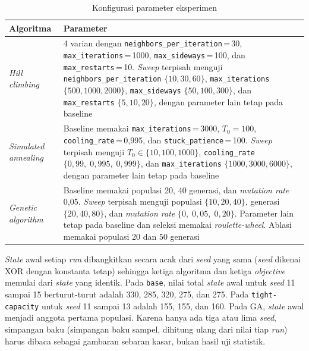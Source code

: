\begin{table}[H]
    \centering
    \begin{tabular}{@{}p{3.4cm}p{11.6cm}@{}}
        \toprule
        Algoritma                    & Parameter                                                                                                                                                                                                                                                                                                                       \\
        \midrule
        \textit{Hill climbing}       & 4 varian dengan \texttt{neighbors\_per\_iteration}\,=\,30, \texttt{max\_iterations}\,=\,1000, \texttt{max\_sideways}\,=\,100, dan \texttt{max\_restarts}\,=\,10. \textit{Sweep} terpisah menguji \texttt{neighbors\_\allowbreak per\_\allowbreak iteration} $\{10,30,60\}$, \texttt{max\_\allowbreak iterations} $\{500,1000,2000\}$, \texttt{max\_\allowbreak sideways} $\{50,100,300\}$, dan \texttt{max\_\allowbreak restarts} $\{5,10,20\}$, dengan parameter lain tetap pada baseline \\
        \textit{Simulated annealing} & Baseline memakai \texttt{max\_iterations}\,=\,3000, $T_0=100$, \texttt{cooling\_rate}\,=\,0,995, dan \texttt{stuck\_patience}\,=\,100. \textit{Sweep} terpisah menguji $T_0\in\{10,100,1000\}$, \texttt{cooling\_rate} $\{0{,}99,\;0{,}995,\;0{,}999\}$, dan \texttt{max\_iterations} $\{1000,3000,6000\}$, dengan parameter lain tetap pada baseline \\
        \textit{Genetic algorithm}   & Baseline memakai populasi 20, 40 generasi, dan \textit{mutation rate} 0,05. \textit{Sweep} terpisah menguji populasi $\{10,20,40\}$, generasi $\{20,40,80\}$, dan \textit{mutation rate} $\{0,\;0{,}05,\;0{,}20\}$. Parameter lain tetap pada baseline dan seleksi memakai \textit{roulette-wheel}. Ablasi memakai populasi 20 dan 50 generasi                          \\
        \bottomrule
    \end{tabular}
    \caption{Konfigurasi parameter eksperimen}
    \label{tab:konfigurasi}
\end{table}

\textit{State} awal setiap \textit{run} dibangkitkan secara acak dari \textit{seed} yang sama (\textit{seed} dikenai XOR dengan konstanta tetap) sehingga ketiga algoritma dan ketiga \textit{objective} memulai dari \textit{state} yang identik. Pada \texttt{base}, nilai total \textit{state} awal untuk \textit{seed} 11 sampai 15 berturut-turut adalah 330, 285, 320, 275, dan 275. Pada \texttt{tight-capacity} untuk \textit{seed} 11 sampai 13 adalah 155, 155, dan 160. Pada GA, \textit{state} awal menjadi anggota pertama populasi. Karena hanya ada tiga atau lima \textit{seed}, simpangan baku (simpangan baku sampel, dihitung ulang dari nilai tiap \textit{run}) harus dibaca sebagai gambaran sebaran kasar, bukan hasil uji statistik.

